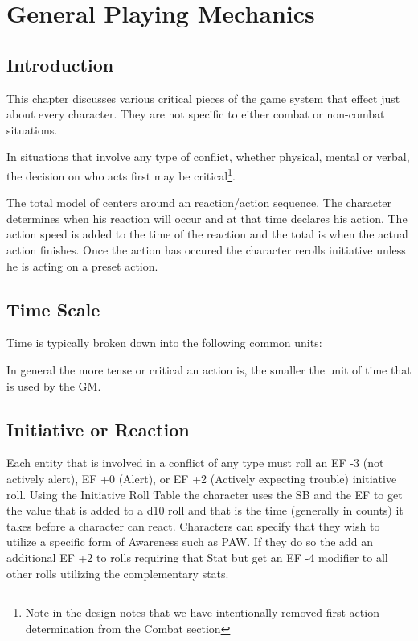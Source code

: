 \chapter{General Playing Mechanics}

\section{Introduction}

This chapter discusses various critical pieces of the game system that 
effect just about every character. They are not specific to either 
combat or non-combat situations. 

In situations that involve any type of conflict, whether physical, 
mental or verbal, the decision on who acts first may be 
critical\footnote{ Note in the design notes that we have intentionally 
removed first action determination from the Combat section}.

The total model of \SH centers around an reaction/action sequence.
The character determines when his reaction will occur and at that time 
declares his action. The action speed is added to the time of the reaction 
and the total is when the actual action finishes. Once the action has 
occured the character rerolls initiative unless he is acting on a
preset action. 

\section{Time Scale}

Time is typically broken down into the following common units:



In general the more tense or critical an action is, the smaller the unit
of time that is used by the GM. 

\section{Initiative or Reaction}

Each entity that is involved in a conflict of any type must roll an 
EF -3 (not actively alert), EF +0 (Alert),  or EF +2 (Actively 
expecting trouble) initiative roll. Using the Initiative Roll Table 
the character uses the SB and the EF to get the value that is added to a
d10 roll and that is the time (generally in counts) it takes before a
character can react. Characters can specify that they wish to utilize 
a specific form of Awareness such as PAW. If they do so the add an 
additional EF +2 to rolls requiring that Stat but get an EF -4 
modifier to all other rolls utilizing the complementary stats. 

